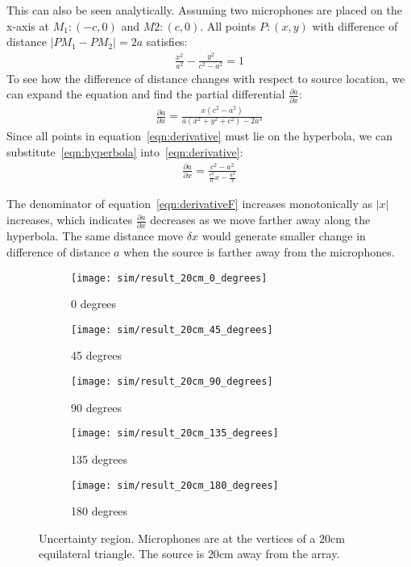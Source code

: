 This can also be seen analytically. Assuming two microphones are placed on the x-axis at $M_1:(-c,0)$ and $M2:(c,0)$. All points $P:(x,y)$ with difference of distance $ |PM_1 - PM_2| = 2a$ satisfies:
\begin{eqnarray}\label{eqn:hyperbola}
\frac{x^2}{a^2} - \frac{y^2}{c^2-a^2} = 1
\end{eqnarray}
To see how the difference of distance changes with respect to source location, we can expand the equation and find the partial differential $\frac{\partial a}{\partial x}$:
\begin{eqnarray}\label{eqn:derivative}
\frac{\partial a}{\partial x} = \frac{x(c^2-a^2)}{a(x^2+y^2+c^2)-2a^3}
\end{eqnarray}
Since all points in equation~\ref{eqn:derivative} must lie on the hyperbola, we can substitute~\ref{eqn:hyperbola} into~\ref{eqn:derivative}:
\begin{eqnarray}\label{eqn:derivativeF}
\frac{\partial a}{\partial x} = \frac{c^2-a^2}{\frac{c^2}{a}x - \frac{a^3}{x}}
\end{eqnarray}

The denominator of equation~\ref{eqn:derivativeF} increases monotonically as $|x|$ increases, which indicates $\frac{\partial a}{\partial x}$ decreases as we move farther away along the hyperbola. The same distance move $\delta x$ would generate smaller change in difference of distance $a$ when the source is farther away from the microphones. 

\begin{figure*}[]
  \centering
  \begin{subfigure}[]{.3\textwidth}
    \texttt{[image: sim/result\_20cm\_0\_degrees]}
    \caption{0 degrees}
  \end{subfigure}
  \begin{subfigure}[]{.3\textwidth}
    \texttt{[image: sim/result\_20cm\_45\_degrees]}
    \caption{45 degrees}
  \end{subfigure}
  \begin{subfigure}[]{.3\textwidth}
    \texttt{[image: sim/result\_20cm\_90\_degrees]}
    \caption{90 degrees}
  \end{subfigure}
  \begin{subfigure}[]{.3\textwidth}
    \texttt{[image: sim/result\_20cm\_135\_degrees]}
    \caption{135 degrees}
  \end{subfigure}
  \begin{subfigure}[]{.3\textwidth}
    \texttt{[image: sim/result\_20cm\_180\_degrees]}
    \caption{180 degrees}
  \end{subfigure}
  \caption{Uncertainty region. Microphones are at the vertices of a $20$cm equilateral triangle. The source is $20$cm away from the array.}
  \label{fig:sim_3_2}
\end{figure*}

